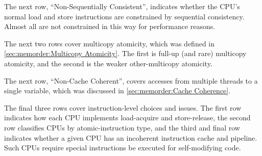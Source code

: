 The next row, ``Non-Sequentially Consistent'', indicates whether
the CPU's normal load and store instructions are constrained by
sequential consistency.
Almost all are not constrained in this way for performance reasons.

The next two rows cover multicopy atomicity, which was defined in
\cref{sec:memorder:Multicopy Atomicity}.
The first is full-up (and rare) multicopy atomicity, and the second is the
weaker other-multicopy atomicity.

The next row, ``Non-Cache Coherent'', covers accesses from multiple
threads to a single variable, which was discussed in
\cref{sec:memorder:Cache Coherence}.

The final three rows cover instruction-level choices and issues.
The first row indicates how each CPU implements load-acquire
and store-release, the second row classifies CPUs by atomic-instruction
type, and the third and final row
indicates whether a given CPU has an incoherent
instruction cache and pipeline.
Such CPUs require special instructions be executed for self-modifying
code.


